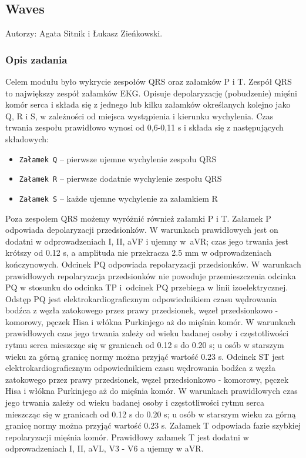 \documentclass[a4paper, 11pt]{article}
\begin{document}
\subsection{Waves}
\label{sec:waves}
Autorzy: Agata Sitnik i Łukasz Zieńkowski.

\subsubsection{Opis zadania}
\label{sec:waves:desc}
Celem modułu było wykrycie zespołów QRS oraz załamków P i T.
Zespół QRS to największy zespół załamków EKG. Opisuje depolaryzację (pobudzenie) mięśni komór serca i składa się z jednego lub kilku załamków określanych kolejno jako Q, R i S, w zależności od miejsca wystąpienia i kierunku wychylenia. Czas trwania zespołu prawidłowo wynosi od 0,6-0,11 s i składa się z następujących składowych:
\begin{itemize}
     \item \verb|Załamek Q|  -- pierwsze ujemne wychylenie zespołu QRS
     \item \verb|Załamek R|  -- pierwsze dodatnie wychylenie zespołu QRS
     \item \verb|Załamek S|  -- każde ujemne wychylenie za załamkiem R
\end{itemize}

Poza zespołem QRS możemy wyróżnić również załamki P i T.
Załamek P odpowiada depolaryzacji przedsionków. W warunkach prawidłowych jest on dodatni w odprowadzeniach I, II, aVF i ujemny w~aVR; czas jego trwania jest krótszy od 0.12 s, a amplituda nie przekracza 2.5 mm w odprowadzeniach kończynowych.
Odcinek PQ odpowiada repolaryzacji przedsionków. W warunkach prawidłowych repolaryzacja przedsionków nie powoduje przemieszczenia odcinka PQ w stosunku do odcinka TP i~odcinek PQ przebiega w linii izoelektrycznej.
Odstęp PQ jest elektrokardiograficznym odpowiednikiem czasu wędrowania bodźca z węzła zatokowego
przez prawy przedsionek, węzeł przedsionkowo - komorowy, pęczek Hisa i włókna Purkinjego aż do mięśnia komór. W warunkach prawidłowych czas jego trwania zależy od wieku badanej osoby i częstotliwości rytmu serca mieszcząc się w granicach od 0.12 s do 0.20 s; u osób w starszym wieku za górną granicę normy można przyjąć wartość 0.23 s.
Odcinek ST jest elektrokardiograficznym odpowiednikiem czasu wędrowania bodźca z węzła zatokowego przez prawy przedsionek, węzeł przedsionkowo - komorowy, pęczek Hisa i włókna Purkinjego aż do mięśnia komór. W warunkach prawidłowych czas jego trwania zależy od wieku badanej osoby i częstotliwości rytmu serca mieszcząc się w granicach od 0.12 s do 0.20 s; u osób w starszym wieku za górną granicę normy można przyjąć wartość 0.23 s.
Załamek T odpowiada fazie szybkiej repolaryzacji mięśnia komór. Prawidłowy załamek T jest dodatni w odprowadzeniach I, II, aVL, V3 - V6 a ujemny w aVR.
\end{document}

